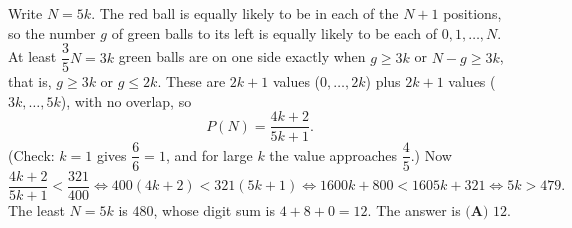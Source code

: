 Write $N=5k$. The red ball is equally likely to be in each of the $N+1$ positions, so the number $g$ of green balls to its left is equally likely to be each of $0,1,\dots,N$. At least $\dfrac35N=3k$ green balls are on one side exactly when $g\ge3k$ or $N-g\ge3k$, that is, $g\ge3k$ or $g\le2k$. These are $2k+1$ values ($0,\dots,2k$) plus $2k+1$ values ($3k,\dots,5k$), with no overlap, so
\[P(N)=\dfrac{4k+2}{5k+1}.\]
(Check: $k=1$ gives $\dfrac66=1$, and for large $k$ the value approaches $\dfrac45$.) Now
\[\dfrac{4k+2}{5k+1}<\dfrac{321}{400}\iff400(4k+2)<321(5k+1)\iff1600k+800<1605k+321\iff5k>479.\]
The least $N=5k$ is $480$, whose digit sum is $4+8+0=12$. The answer is $\boxed{\textbf{(A) }12}$.
